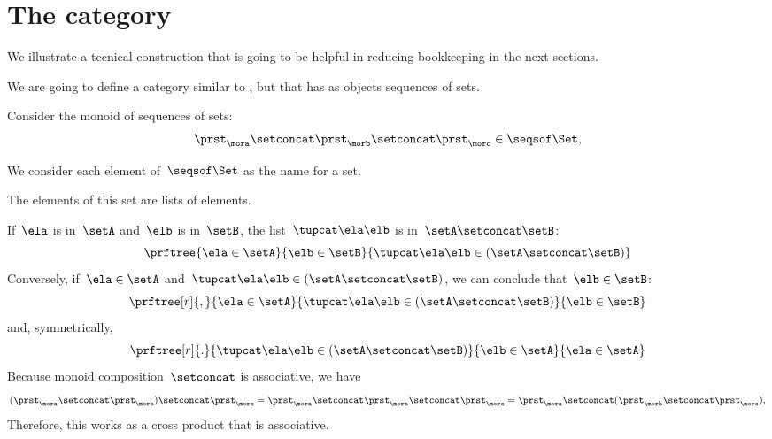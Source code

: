 \section{The \SetStar category}
\label{sec:SetStar}

We illustrate a tecnical construction that is going to be helpful in reducing bookkeeping in the next sections.

We are going to define a category similar to \Set, but that has as objects sequences of sets.

Consider the monoid of sequences of sets:
%
\begin{equation}
    \label{eq:sets-monoid}
    \prst_{\mora} \setconcat \prst_{\morb} \setconcat \prst_{\morc} \in \seqsof\Set,
\end{equation}
%

We consider each element of~$\seqsof\Set$ as the name for a set.

The elements of this set are lists of elements.

If~$\ela$ is in~$\setA$ and~$\elb$ is in~$\setB$, the list~$\tupcat \ela \elb$ is in~$\setA \setconcat \setB$:
%
\begin{equation}
    \label{eq:sets-monoid-axiom1}
    \prftree{\ela \in \setA}{\elb \in \setB}{ \tupcat \ela \elb \in (\setA \setconcat \setB) }
\end{equation}
%
Conversely, if~$\ela \in \setA$ and~$\tupcat \ela \elb \in (\setA \setconcat \setB)$, we can conclude that~$\elb \in \setB$:
%
\begin{equation}
    \label{eq:sets-monoid-axiom2}
    \prftree[r]{,}{\ela \in \setA}{ \tupcat \ela \elb \in (\setA \setconcat \setB) }{  \elb \in  \setB }
\end{equation}
% 
and, symmetrically, 
% 
\begin{equation}
    \label{eq:sets-monoid-axiom3}
    \prftree[r]{.}{ \tupcat \ela \elb \in (\setA \setconcat \setB) }{\elb \in \setA}{  \ela \in  \setA }
\end{equation}
% 
Because monoid composition~$\setconcat$ is associative, we have
%
\begin{equation}
    \label{eq:sets-monoid-comp}
    (\prst_{\mora} \setconcat \prst_{\morb} )\setconcat \prst_{\morc} =
    \prst_{\mora} \setconcat \prst_{\morb} \setconcat \prst_{\morc} =
    \prst_{\mora} \setconcat (\prst_{\morb} \setconcat \prst_{\morc}),
\end{equation}
%
Therefore, this works as a cross product that is associative.

